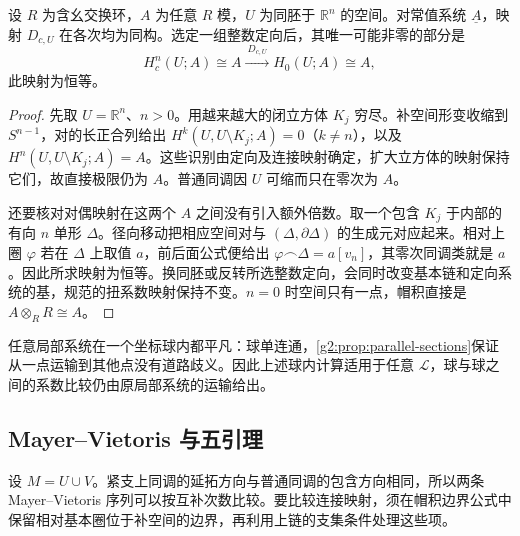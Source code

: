\begin{lemma}\label{g2:lem:euclidean-duality}
	设 \(R\) 为含幺交换环，\(A\) 为任意 \(R\) 模，\(U\) 为同胚于 \(\mathbb R^n\) 的空间。对常值系统 \(\underline A\)，映射 \(D_{c,U}\) 在各次均为同构。选定一组整数定向后，其唯一可能非零的部分是
	\[
		H_c^n(U;A)\cong A\xrightarrow{\ D_{c,U}\ }H_0(U;A)\cong A,
	\]
	此映射为恒等。
\end{lemma}
\begin{proof}
	先取 \(U=\mathbb R^n\)、\(n>0\)。用越来越大的闭立方体 \(K_j\) 穷尽。补空间形变收缩到 \(S^{n-1}\)，对的长正合列给出 \(H^k(U,U\setminus K_j;A)=0\)（\(k\ne n\)），以及 \(H^n(U,U\setminus K_j;A)=A\)。这些识别由定向及连接映射确定，扩大立方体的映射保持它们，故直接极限仍为 \(A\)。普通同调因 \(U\) 可缩而只在零次为 \(A\)。

	还要核对对偶映射在这两个 \(A\) 之间没有引入额外倍数。取一个包含 \(K_j\) 于内部的有向 \(n\) 单形 \(\Delta\)。径向移动把相应空间对与 \((\Delta,\partial\Delta)\) 的生成元对应起来。相对上圈 \(\varphi\) 若在 \(\Delta\) 上取值 \(a\)，前后面公式便给出 \(\varphi\frown\Delta=a[v_n]\)，其零次同调类就是 \(a\)。因此所求映射为恒等。换同胚或反转所选整数定向，会同时改变基本链和定向系统的基，规范的扭系数映射保持不变。\(n=0\) 时空间只有一点，帽积直接是 \(A\otimes_RR\cong A\)。
\end{proof}

任意局部系统在一个坐标球内都平凡：球单连通，\cref{g2:prop:parallel-sections}保证从一点运输到其他点没有道路歧义。因此上述球内计算适用于任意 \(\mathcal L\)，球与球之间的系数比较仍由原局部系统的运输给出。

\subsection{Mayer–Vietoris 与五引理}
\label{g2:subsec:0603:02}
设 \(M=U\cup V\)。紧支上同调的延拓方向与普通同调的包含方向相同，所以两条 Mayer--Vietoris 序列可以按互补次数比较。要比较连接映射，须在帽积边界公式中保留相对基本圈位于补空间的边界，再利用上链的支集条件处理这些项。

